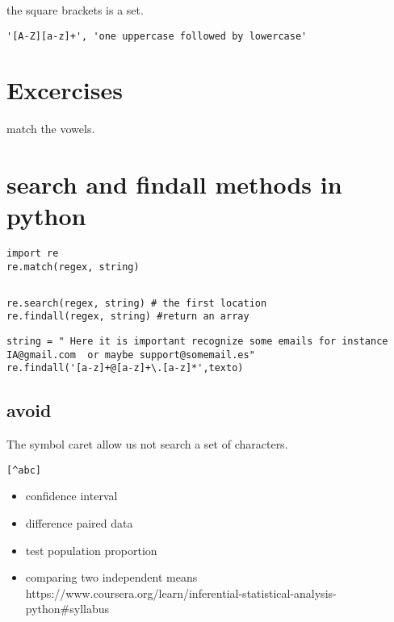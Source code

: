 \documentclass[10pt,a4paper]{article}
\begin{document}
the square brackets is a set.


\begin{lstlisting}
'[A-Z][a-z]+', 'one uppercase followed by lowercase'
\end{lstlisting}


\section{Excercises}
match the vowels.












\section{search and findall methods in python}
\begin{lstlisting}
import re
re.match(regex, string)
\end{lstlisting}


\begin{lstlisting}

\end{lstlisting}






\begin{lstlisting}
re.search(regex, string) # the first location
re.findall(regex, string) #return an array 
\end{lstlisting}



\begin{lstlisting}
string = " Here it is important recognize some emails for instance IA@gmail.com  or maybe support@somemail.es"
re.findall('[a-z]+@[a-z]+\.[a-z]*',texto)
\end{lstlisting}



\subsection{avoid}
The symbol caret allow us not search a set of characters.
\begin{verbatim}
[^abc]
\end{verbatim}



\begin{itemize}
\item confidence interval
\item difference paired data
\item test population proportion
\item comparing two independent means
https://www.coursera.org/learn/inferential-statistical-analysis-python#syllabus

\end{itemize}
\end{document}
